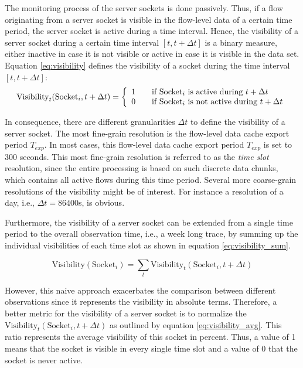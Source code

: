 The monitoring process of the \glspl{server socket} is done passively. Thus, if a flow originating from a \gls{server socket} is visible in the flow-level data of a certain time period, the \gls{server socket} is active during a time interval. Hence, the visibility of a \gls{server socket} during a certain time interval $[t,t+\Delta{t}]$ is a binary measure, either inactive in case it is not visible or active in case it is visible in the data set. Equation \ref{eq:visibility} defines the visibility of a socket during the time interval $[t,t+\Delta{t}]$:
\begin{equation}
	\text{Visibility}_t(\text{Socket}_i,t+\Delta{t}) = \left\{
	\begin{array}{l l}
		1 & \quad \text{if $\text{Socket}_i$ is active during $t+\Delta{t}$}\\
		0 & \quad \text{if $\text{Socket}_i$ is not active during $t+\Delta{t}$}\\
	\end{array}
	\right.
	\label{eq:visibility}
\end{equation}

In consequence, there are different granularities $\Delta{t}$ to define the visibility of a \gls{server socket}. The most fine-grain resolution is the flow-level data cache export period $T_{exp}$. In most cases, this flow-level data cache export period $T_{exp}$ is set to 300 seconds. This most fine-grain resolution is referred to as the \emph{time slot} resolution, since the entire processing is based on such discrete data chunks, which contains all active flows during this time period. 
Several more coarse-grain resolutions of the visibility might be of interest. For instance a resolution of a day, i.e., $\Delta{t} = 86400$s, is obvious.

Furthermore, the visibility of a \gls{server socket} can be extended from a single time period to the overall observation time, i.e., a week long trace, by summing up the individual visibilities of each time slot as shown in equation \ref{eq:visibility_sum}.

\begin{equation}
	\text{Visibility}(\text{Socket}_i) = \sum_{t} \text{Visibility}_t(\text{Socket}_i,t+\Delta{t})
	\label{eq:visibility_sum}
\end{equation}

However, this naive approach exacerbates the comparison between different observations since it represents the visibility in absolute terms. 
Therefore, a better metric for the visibility of a \gls{server socket} is to normalize the $\text{Visibility}_t(\text{Socket}_i,t+\Delta{t})$ as outlined by equation \ref{eq:visibility_avg}.
This ratio represents the average visibility of this socket in percent.
Thus, a value of 1 means that the socket is visible in every single time slot and a value of 0 that the socket is never active.

